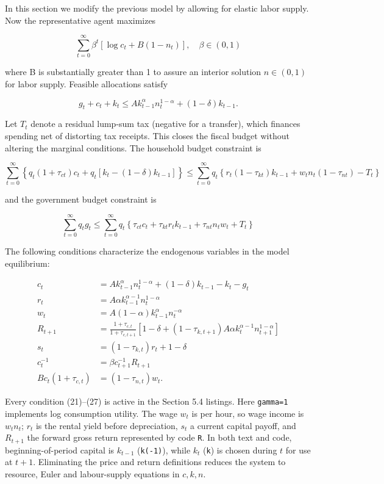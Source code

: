 \documentclass[12pt]{article}
\begin{document}
In this section we modify the previous model by allowing for elastic labor supply. Now the representative agent maximizes

$$
\sum_{t=0}^{\infty} \beta^{t} [\log c_t+B(1-n_t)], \quad \beta \in(0,1)
$$

where B is substantially greater than 1 to assure an interior solution $n \in(0,1)$ for labor supply. Feasible allocations satisfy

$$
g_{t}+c_{t}+k_{t} \leq A k_{t-1}^{\alpha} n_{t}^{1-\alpha}+(1-\delta) k_{t-1} .
$$

Let $T_t$ denote a residual lump-sum tax (negative for a transfer), which finances spending net of distorting tax receipts. This closes the fiscal budget without altering the marginal conditions. The household budget constraint is

$$
\sum_{t=0}^{\infty}\left\{q_{t}\left(1+\tau_{c t}\right)c_t+q_{t}\left[k_{t}-(1-\delta) k_{t-1}\right]\right\} \leq \sum_{t=0}^{\infty} q_{t}\left\{r_{t}\left(1-\tau_{k t}\right) k_{t-1}+w_{t}n_t\left(1-\tau_{n t}\right)-T_t\right\}
$$

and the government budget constraint is

$$
\sum_{t=0}^{\infty} q_{t} g_{t} \leq \sum_{t=0}^{\infty} q_{t}\left\{\tau_{c t} c_{t}+\tau_{k t} r_{t} k_{t-1}+\tau_{n t} n_{t} w_{t}+T_t\right\}
$$

The following conditions characterize the endogenous variables in the model equilibrium:


\begin{align*}
c_t &= A k_{t-1}^\alpha n_t^{1-\alpha}+(1-\delta)k_{t-1}-k_{t}-g_t \tag{21}\\
r_t &= A\alpha k_{t-1}^{\alpha-1}n_t^{1-\alpha} \tag{22}\\
w_t &= A(1-\alpha)k_{t-1}^\alpha n_t^{-\alpha} \tag{23}\\
R_{t+1} &= \frac{1+\tau_{c,t}}{1+\tau_{c,t+1}}
 \left[1-\delta+(1-\tau_{k,t+1})A\alpha k_{t}^{\alpha-1}n_{t+1}^{1-\alpha}\right] \tag{24}\\
s_t &= (1-\tau_{k,t})r_t+1-\delta \tag{25}\\
c_t^{-1} &= \beta c_{t+1}^{-1}R_{t+1} \tag{26}\\
B c_t(1+\tau_{c,t}) &= (1-\tau_{n,t})w_t. \tag{27}
\end{align*}

Every condition (21)--(27) is active in the Section 5.4 listings. Here \texttt{gamma=1} implements log consumption utility. The wage $w_t$ is per hour, so wage income is $w_t n_t$; $r_t$ is the rental yield before depreciation, $s_t$ a current capital payoff, and $R_{t+1}$ the forward gross return represented by code \texttt{R}. In both text and code, beginning-of-period capital is $k_{t-1}$ (\texttt{k(-1)}), while $k_t$ (\texttt{k}) is chosen during $t$ for use at $t+1$. Eliminating the price and return definitions reduces the system to resource, Euler and labour-supply equations in $c,k,n$.
\end{document}
